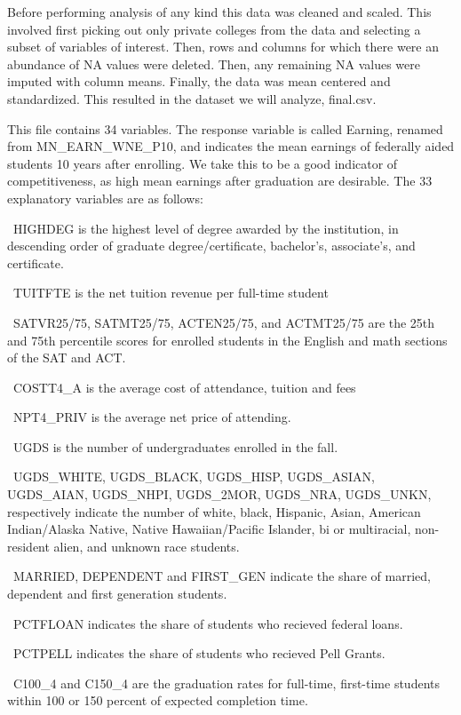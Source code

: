 \documentclass{article}
\begin{document}
Before performing analysis of any kind this data was cleaned and scaled. This involved first picking out only private colleges from the data and selecting a subset of variables of interest. Then, rows and columns for which there were an abundance of NA values were deleted. Then, any remaining NA values were imputed with column means. Finally, the data was mean centered and standardized. This resulted in the dataset we will analyze, final.csv.

This file contains 34 variables. The response variable is called Earning, renamed from MN\_EARN\_WNE\_P10, and indicates the mean earnings of federally aided students 10 years after enrolling. We take this to be a good indicator of competitiveness, as high mean earnings after graduation are desirable. The 33 explanatory variables are as follows:

\textbullet\ HIGHDEG is the highest level of degree awarded by the institution, in descending order of graduate degree/certificate, bachelor's, associate's, and certificate.

\textbullet\ TUITFTE is the net tuition revenue per full-time student

\textbullet\ SATVR25/75, SATMT25/75, ACTEN25/75, and ACTMT25/75 are the 25th and 75th percentile scores for enrolled students in the English and math sections of the SAT and ACT.

\textbullet\ COSTT4\_A is the average cost of attendance, tuition and fees

\textbullet\ NPT4\_PRIV is the average net price of attending.

\textbullet\ UGDS is the number of undergraduates enrolled in the fall.

\textbullet\ UGDS\_WHITE, UGDS\_BLACK, UGDS\_HISP, UGDS\_ASIAN, UGDS\_AIAN, UGDS\_NHPI, UGDS\_2MOR, UGDS\_NRA, UGDS\_UNKN, respectively indicate the number of white, black, Hispanic, Asian, American Indian/Alaska Native, Native Hawaiian/Pacific Islander, bi or multiracial, non-resident alien, and unknown race students.

\textbullet\ MARRIED, DEPENDENT and FIRST\_GEN indicate the share of married, dependent and first generation students.

\textbullet\ PCTFLOAN indicates the share of students who recieved federal loans.

\textbullet\ PCTPELL indicates the share of students who recieved Pell Grants.

\textbullet\ C100\_4 and C150\_4 are the graduation rates for full-time, first-time students within 100 or 150 percent of expected completion time.
\end{document}
